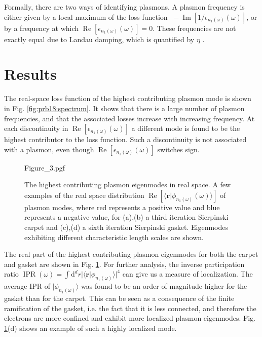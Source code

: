 Formally, there are two ways of identifying plasmons. A plasmon frequency is either given by a local maximum of the loss function $\;-\operatorname{Im}[1/\epsilon_{n_1(\omega)}(\omega)]$, or by a frequency at which $\operatorname{Re}[\epsilon_{n_1(\omega)}(\omega)] = 0$. These frequencies are not exactly equal due to Landau damping, which is quantified by $\eta$ \cite{andersen2012spatially}.

\section{Results}

The real-space loss function of the highest contributing plasmon mode is shown in Fig. \ref{fig:prb18:spectrum}. It shows that there is a large number of plasmon frequencies, and that the associated losses increase with increasing frequency. At each discontinuity in $\operatorname{Re}[\epsilon_{n_1(\omega)}(\omega)]$ a different mode is found to be the highest contributor to the loss function. Such a discontinuity is not associated with a plasmon, even though $\operatorname{Re}[\epsilon_{n_1(\omega)}(\omega)]$ switches sign.

\begin{figure}[h]
    \centering
    {Figure_3.pgf}
    \caption{
        The highest contributing plasmon eigenmodes in real space. A few
        examples of the real space distribution
        $\operatorname{Re}[\langle\mathbf{r}|
        \phi_{n_1(\omega)}(\omega)\rangle]$ of plasmon modes,
        where red represents a positive value and blue represents a negative value, for
        (a),(b) a third iteration Sierpinski carpet and
        (c),(d) a sixth iteration Sierpinski gasket. Eigenmodes
        exhibiting different characteristic length scales are shown.
    }
    \label{fig:prb18:eigenstates}
\end{figure}

The real part of the highest contributing plasmon eigenmodes for both the carpet and gasket are shown in Fig. \ref{fig:prb18:eigenstates}. For further analysis, the inverse participation ratio $\operatorname{IPR}(\omega) = \int\!\!\text{d}^d r |\langle \mathbf{r}|\phi_{n_1(\omega)} \rangle|^4$ can give us a measure of localization. The average IPR of $|\phi_{n_1(\omega)}\rangle$ was found to be an order of magnitude higher for the gasket than for the carpet. This can be seen as a consequence of the finite ramification of the gasket, i.e. the fact that it is less connected, and therefore the electrons are more confined and exhibit more localized plasmon eigenmodes. Fig. \ref{fig:prb18:eigenstates}(d) shows an example of such a highly localized mode.

